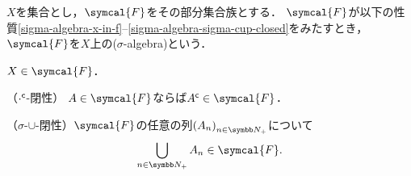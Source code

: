 \documentclass[../main.tex]{subfiles}
\begin{document}
\begin{thmbox}
\begin{definition}
\(X\)を集合とし，\(\symcal{F}\)をその部分集合族とする．
\(\symcal{F}\)が以下の性質\ref{sigma-algebra-x-in-f}--\ref{sigma-algebra-sigma-cup-closed}をみたすとき，
\(\symcal{F}\)を\(X\)上の(\(\sigma\)-algebra)という{\footnotemark}．
\begin{conditions}
    \item\label{sigma-algebra-x-in-f}
        \(X \in \symcal{F}\)．
    \item\label{sigma-algebra-comp-closed} （\({\mathord{\cdot}}^{\mathsf{c}}\)-閉性） \(A \in \symcal{F}\)ならば\(\setcomp{A} \in \symcal{F}\)．
    \item\label{sigma-algebra-sigma-cup-closed} （\(\sigma\)-\(\mathord{\cup}\)-閉性）\(\symcal{F}\)の任意の列\(\Sequence{A}\)について
        \begin{align*}
            \bigcup_{n \in \PositiveInteger} A_n \in \symcal{F}.
        \end{align*}
\end{conditions}
\end{definition}
\end{thmbox}

\end{document}

